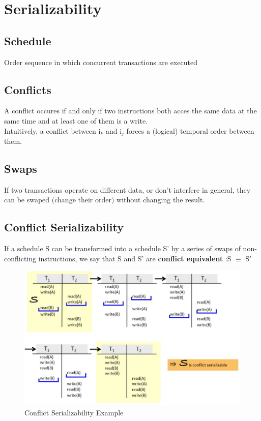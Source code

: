 	\section{Serializability}
		
		\subsection{Schedule}
		
			Order sequence in which concurrent transactions are executed
		
		\subsection{Conflicts}
		
			A conflict occures if and only if two instructions both acces the same data at the same time and at least one of them is a write.\\
			Intuitively, a conflict between i$ _k $ and i$ _j $ forces a (logical) temporal order between them. 
		
		\subsection{Swaps}
		
			If two transactions operate on different data, or don't interfere in general, they can be swaped $ ( $change their order$ ) $ without changing the result.
		
		\subsection{Conflict Serializability}
			
			If a schedule S can be transformed into a schedule S’ by a series of swaps of non-conflicting instructions, we say that S and S’ are \textbf{conflict equivalent} :S $ \equiv $ S’ 
			\begin{figure}[h!]
				\includegraphics[scale=0.5]{res/conflict_serializable.jpg}
				\caption{Conflict Serializability Example}
			\end{figure}
			
